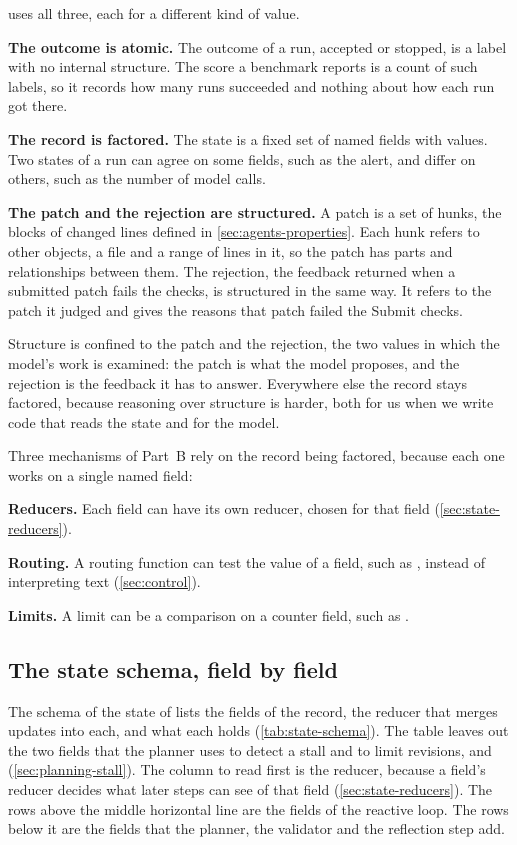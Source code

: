 \msa{} uses all three, each for a different kind of value.
\bi
\item \textbf{The outcome is atomic.} The outcome of a run, accepted or stopped, is a label with no
internal structure. The score a benchmark reports is a count of such labels, so it records how many
runs succeeded and nothing about how each run got there.
\item \textbf{The record is factored.} The state is a fixed set of named fields with values. Two
states of a run can agree on some fields, such as the alert, and differ on others, such as the
number of model calls.
\item \textbf{The patch and the rejection are structured.} A patch is a set of hunks, the blocks of
changed lines defined in \cref{sec:agents-properties}. Each hunk refers to other objects, a file and a range of
lines in it, so the patch has parts and relationships between them. The rejection, the feedback
returned when a submitted patch fails the checks, is structured in the same way. It refers to the
patch it judged and gives the reasons that patch failed the Submit checks.
\ei

Structure is confined to the patch and the rejection, the two values in which the model's work is
examined: the patch is what the model proposes, and the rejection is the feedback it has to answer.
Everywhere else the record stays factored, because reasoning over structure is harder, both for us
when we write code that reads the state and for the model.

Three mechanisms of Part~B rely on the record being factored, because each one works on a single
named field:
\bi
\item \textbf{Reducers.} Each field can have its own reducer, chosen for that field
(\cref{sec:state-reducers}).
\item \textbf{Routing.} A routing function can test the value of a field, such as
, instead of interpreting text (\cref{sec:control}).
\item \textbf{Limits.} A limit can be a comparison on a counter field, such as
.
\ei

\subsection{The state schema, field by field}
\label{sec:state-schema}

The schema of the state of \msa{} lists the fields of the record, the reducer that merges updates
into each, and what each holds (\cref{tab:state-schema}). The table leaves out the two fields that
the planner uses to detect a stall and to limit revisions,  and
 (\cref{sec:planning-stall}). The column to read first is the reducer, because a field's
reducer decides what later steps can see of that field (\cref{sec:state-reducers}). The rows above
the middle horizontal line are the fields of the reactive loop. The rows below it are the fields
that the planner, the validator and the reflection step add.

